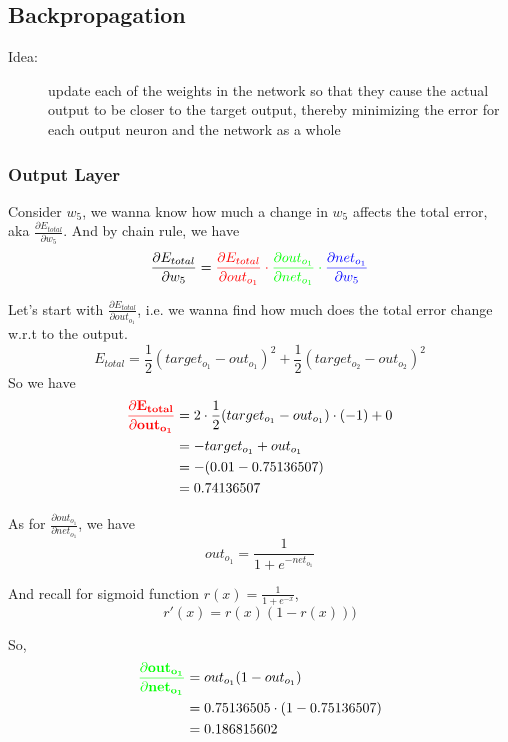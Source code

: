 \documentclass[fleqn,10pt]{olplainarticle}
\theoremstyle{definition}
\theoremstyle{remark}
\begin{document}
\subsection*{Backpropagation}
\begin{description}
\item [Idea: ] update each of the weights in the network so that they cause the actual output to be closer to the target output, thereby minimizing the error for each output neuron and the network as a whole
\end{description}

\subsubsection*{Output Layer}
Consider $w_5$, we wanna know how much a change in $w_5$ affects the total error, aka $\frac{\partial E_{total}}{\partial w_5}$. And by chain rule, we have
$$\frac{\partial E_{total}}{\partial w_5} = 
\color{red}{\frac{\partial E_{total}}{\partial out_{o_1}}} \cdot
\color{green}{\frac{\partial out_{o_1}}{\partial net_{o_1}}} \cdot
\color{blue}{\frac{\partial net_{o_1}}{\partial w_5}}
$$

Let's start with $\frac{\partial E_{total}}{\partial out_{o_1}}$, i.e. we wanna find how much does the total error change w.r.t to the output.
$$E_{total} = \frac{1}{2}(target_{o_1} - out_{o_1})^2 + \frac{1}{2}(target_{o_2} - out_{o_2})^2$$
So we have
$$
\begin{aligned}
\mathbf{\color{red}{\frac{\partial E_{total}}{\partial out_{o_1}}}} 
& = 2 \cdot \frac{1}{2}(target_{o_1} - out_{o_1}) \cdot (-1) + 0 \\
& = -target_{o_1} + out_{o_1} \\
& = -(0.01 - 0.75136507) \\
& = 0.74136507
\end{aligned}
$$

As for $\frac{\partial out_{o_1}}{\partial net_{o_1}}$, we have
$$
out_{o_1} = \frac{1}{1 + e^{-net_{o_1}}}
$$

And recall for sigmoid function $r(x) = \frac{1}{1+e^{-x}}$,
$$r'(x) = r(x)(1 - r(x)))$$

So,
$$
\begin{aligned}
\mathbf{\color{green}{\frac{\partial out_{o_1}}{\partial net_{o_1}}}}
& = out_{o_1}(1-out_{o_1}) \\
& = 0.75136505 \cdot (1-0.75136507) \\
& = 0.186815602
\end{aligned}
$$
\end{document}
